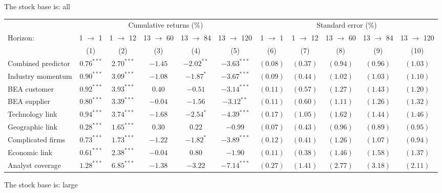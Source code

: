 \documentclass[
]{article}
\author{}
\date{\vspace{-2.5em}}
\begin{document}
The stock base is: all

\begin{tabular}{lcccccccccc}
   \toprule & \multicolumn{5}{c}{Cumulative returns (\%)} & \multicolumn{5}{c}{Standard error (\%)} \\
 \cmidrule(l){2-6} \cmidrule(l){7-11}Horizon: & 1 $\rightarrow$ 1 & 1 $\rightarrow$ 12 & 13 $\rightarrow$ 60 & 13 $\rightarrow$ 84 & 13 $\rightarrow$ 120 & 1 $\rightarrow$ 1 & 1 $\rightarrow$ 12 & 13 $\rightarrow$ 60 & 13 $\rightarrow$ 84 & 13 $\rightarrow$ 120 \\ 
   \cmidrule(l){2-6} \cmidrule(l){7-11} \vspace{5pt} & (1) & (2) & (3) & (4) & (5) & (6) & (7) & (8) & (9) & (10) \\ 
   \vspace{5pt}Combined predictor & $0.76^{***}$ & $2.70^{***}$ & $-1.45$ & $-2.02^{**}$ & $-3.63^{***}$ & $(0.08)$ & $(0.37)$ & $(0.94)$ & $(0.96)$ & $(1.03)$ \\ 
  Industry momentum & $0.90^{***}$ & $3.09^{***}$ & $-1.08$ & $-1.87^{*}$ & $-3.67^{***}$ & $(0.09)$ & $(0.44)$ & $(1.02)$ & $(1.03)$ & $(1.10)$ \\ 
  BEA customer & $0.92^{***}$ & $3.93^{***}$ & $0.40$ & $-0.51$ & $-3.14^{***}$ & $(0.11)$ & $(0.57)$ & $(1.27)$ & $(1.43)$ & $(1.20)$ \\ 
  BEA supplier & $0.80^{***}$ & $3.39^{***}$ & $-0.04$ & $-1.56$ & $-3.12^{**}$ & $(0.11)$ & $(0.60)$ & $(1.11)$ & $(1.26)$ & $(1.32)$ \\ 
  Technology link & $0.94^{***}$ & $3.74^{***}$ & $-1.68$ & $-2.54^{*}$ & $-4.39^{***}$ & $(0.17)$ & $(1.05)$ & $(1.62)$ & $(1.44)$ & $(1.46)$ \\ 
  Geographic link & $0.28^{***}$ & $1.65^{***}$ & $0.30$ & $0.22$ & $-0.99$ & $(0.07)$ & $(0.43)$ & $(0.96)$ & $(0.89)$ & $(0.95)$ \\ 
  Complicated firms & $0.73^{***}$ & $1.73^{***}$ & $-1.22$ & $-1.82^{*}$ & $-3.89^{***}$ & $(0.12)$ & $(0.41)$ & $(1.26)$ & $(1.07)$ & $(0.94)$ \\ 
  Economic link & $0.61^{***}$ & $2.38^{***}$ & $-0.04$ & $0.80$ & $-1.90$ & $(0.11)$ & $(0.38)$ & $(1.46)$ & $(1.58)$ & $(1.37)$ \\ 
  Analyst coverage & $1.28^{***}$ & $6.85^{***}$ & $-1.38$ & $-3.22$ & $-7.14^{***}$ & $(0.27)$ & $(1.41)$ & $(2.77)$ & $(3.18)$ & $(2.11)$ \\ 
   \bottomrule 
\end{tabular}

The stock base is: large
\end{document}
